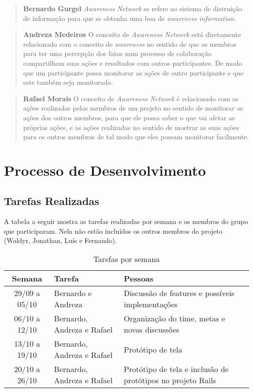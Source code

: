 \documentclass{acm_proc_article-sp}
\begin{document}
\begin{quote}\textbf{Bernardo Gurgel}
\textsl{Awareness Network} se refere ao sistema de distruição de informação para que se obtenha uma boa de \textsl{awareness information}.
\end{quote}

\begin{quote}\textbf{Andreza Medeiros}
O conceito de \textsl{Awareness Network} está diretamente relacionado com o conceito de \textsl{awareness} no sentido de que os membros para ter uma percepção dos fatos num processo de colaboração compartilham suas ações e resultados com outros participantes. De modo que um participante possa monitorar as ações de outro participante e que este também seja monitorado. 
\end{quote}

\begin{quote}\textbf{Rafael Morais}
  O conceito de \textsl{Awareness Network} é relacionado com as ações realizadas pelos membros de um projeto no sentido de
  monitorar as ações dos outros membros, para que ele possa saber o que vai afetar as próprias ações, e as ações realizadas no sentido de
  mostrar as suas ações para os outros membros de tal modo que eles possam monitorar facilmente.
\end{quote}

\section{Processo de Desenvolvimento}
\subsection{Tarefas Realizadas}
A tabela a seguir mostra as tarefas realizadas por semana e os membros do grupo que participaram.
Nela não estão incluídos os outros membros do projeto (Waldyr, Jonathan, Luís e Fernando).

\begin{table}[h]
  \caption{Tarefas por semana}
  \begin{tabular}{|cp{3cm}p{3cm}|}
    \hline
    Semana&Tarefa&Pessoas\\
    \hline
    29/09 a 05/10&Bernardo e Andreza&Discussão de features e possíveis implementações\\
    06/10 a 12/10&Bernardo, Andreza e Rafael&Organização do time, metas e novas discussões\\
    13/10 a 19/10&Bernardo, Andreza e Rafael&Protótipo de tela\\
    20/10 a 26/10&Bernardo, Andreza e Rafael&Protótipo de tela e inclusão de protótipos no projeto Rails\\
    \hline
  \end{tabular}
\end{table}
\end{document}
